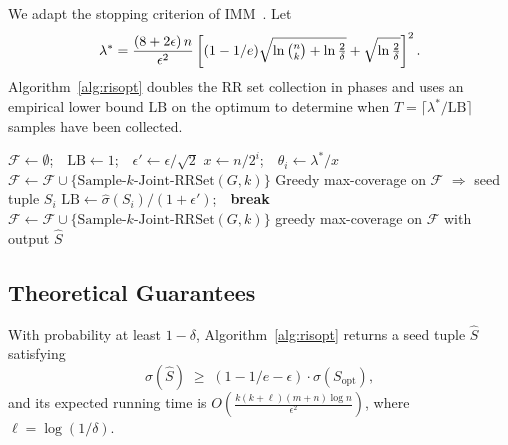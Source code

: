 \documentclass[sigconf]{acmart}
\begin{document}
We adapt the stopping criterion of IMM~\cite{tang2015influence}. Let
\[
  \lambda^* = \frac{(8 + 2\epsilon)\, n}{\epsilon^2}
  \left[(1-1/e)\sqrt{\ln\tbinom{n}{k} + \ln\tfrac{2}{\delta}} + \sqrt{\ln\tfrac{2}{\delta}}\right]^2.
\]
Algorithm~\ref{alg:risopt} doubles the RR set collection in phases and uses an empirical lower bound $\mathrm{LB}$ on the optimum to determine when $T = \lceil\lambda^*/\mathrm{LB}\rceil$ samples have been collected.

\begin{algorithm}[t]
\caption{RIS-Optimized$(G, k, \epsilon, \delta)$}
\label{alg:risopt}
\begin{algorithmic}[1]
\State $\mathcal{F} \leftarrow \emptyset$;\ \ $\mathrm{LB} \leftarrow 1$;\ \ $\epsilon' \leftarrow \epsilon/\sqrt{2}$
  \State $x \leftarrow n / 2^i$;\ \ $\theta_i \leftarrow \lambda^* / x$
    \State $\mathcal{F} \leftarrow \mathcal{F} \cup \{\text{Sample-}k\text{-Joint-RRSet}(G, k)\}$
  \EndWhile
  \State Greedy max-coverage on $\mathcal{F}$ $\Rightarrow$ seed tuple $S_i$
    \State $\mathrm{LB} \leftarrow \hat{\sigma}(S_i)/(1+\epsilon')$;\ \ \textbf{break}
  \EndIf
\EndFor
{}
  \State $\mathcal{F} \leftarrow \mathcal{F} \cup \{\text{Sample-}k\text{-Joint-RRSet}(G, k)\}$
\EndWhile
\State \Return greedy max-coverage on $\mathcal{F}$ with output $\hat{S}$
\end{algorithmic}
\end{algorithm}

\subsection{Theoretical Guarantees}

\begin{theorem}
\label{thm:approx}
With probability at least $1 - \delta$, Algorithm~\ref{alg:risopt} returns a seed tuple $\hat{S}$ satisfying
\[
  \sigma(\hat{S}) \;\geq\; (1 - 1/e - \epsilon)\cdot \sigma(S_{\mathrm{opt}}),
\]
and its expected running time is $O\!\left(\frac{k(k + \ell)(m + n)\log n}{\epsilon^2}\right)$, where $\ell = \log(1/\delta)$.
\end{theorem}
\end{document}
